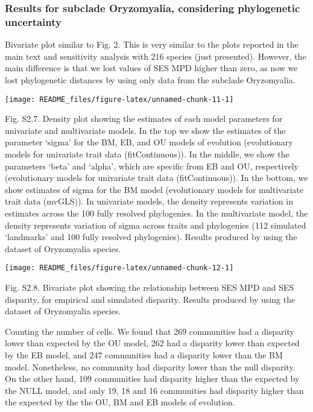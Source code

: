 \documentclass[
]{article}
\begin{document}
\newpage

\hypertarget{results-for-subclade-oryzomyalia-considering-phylogenetic-uncertainty}{%
\subsubsection{Results for subclade Oryzomyalia, considering
phylogenetic
uncertainty}\label{results-for-subclade-oryzomyalia-considering-phylogenetic-uncertainty}}

Bivariate plot similar to Fig. 2. This is very similar to the plots
reported in the main text and sensitivity analysis with 216 species
(just presented). However, the main difference is that we lost values of
SES MPD higher than zero, as now we lost phylogenetic distances by using
only data from the subclade Oryzomyalia.

\begin{center}\texttt{[image: README\_files/figure-latex/unnamed-chunk-11-1]} \end{center}

Fig. S2.7. Density plot showing the estimates of each model parameters
for univariate and multivariate models. In the top we show the estimates
of the parameter `sigma' for the BM, EB, and OU models of evolution
(evolutionary models for univariate trait data (fitContinuous)). In the
middle, we show the parameters `beta' and `alpha', which are specific
from EB and OU, respectively (evolutionary models for univariate trait
data (fitContinuous)). In the bottom, we show estimates of sigma for the
BM model (evolutionary models for multivariate trait data (mvGLS)). In
univariate models, the density represents variation in estimates across
the 100 fully resolved phylogenies. In the multivariate model, the
density represents variation of sigma across traits and phylogenies (112
simulated `landmarks' and 100 fully resolved phylogenies). Results
produced by using the dataset of Oryzomyalia species.

\begin{center}\texttt{[image: README\_files/figure-latex/unnamed-chunk-12-1]} \end{center}

Fig. S2.8. Bivariate plot showing the relationship between SES MPD and
SES disparity, for empirical and simulated disparity. Results produced
by using the dataset of Oryzomyalia species.

Counting the number of cells. We found that 269 communities had a
disparity lower than expected by the OU model, 262 had a disparity lower
than expected by the EB model, and 247 communities had a disparity lower
than the BM model. Nonetheless, no community had disparity lower than
the null disparity. On the other hand, 109 communities had disparity
higher than the expected by the NULL model, and only 19, 18 and 16
communities had disparity higher than the expected by the the OU, BM and
EB models of evolution.
\end{document}

